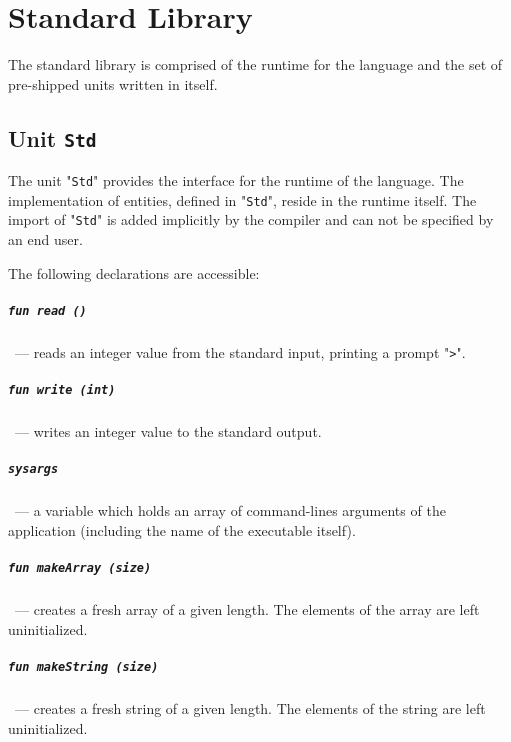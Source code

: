 \chapter{Standard Library}
\label{sec:stdlib}

The standard library is comprised of the runtime for the language and the set of pre-shipped units written in \lama itself.

\section{Unit \texttt{Std}}

The unit "\texttt{Std}" provides the interface for the runtime of the language. The implementation of
entities, defined in "\texttt{Std}", reside in the runtime itself. The import of "\texttt{Std}"
is added implicitly by the compiler and can not be specified by an end user.

The following declarations are accessible:

\paragraph{\lstinline|fun read ()|}~--- reads an integer value from the standard input, printing a prompt "\texttt{>}".

\paragraph{\lstinline|fun write (int)|}~--- writes an integer value to the standard output.

\paragraph{\lstinline|sysargs|}~--- a variable which holds an array of command-lines arguments of the application (including the
name of the executable itself).

\paragraph{\lstinline|fun makeArray (size)|}~--- creates a fresh array of a given length. The elements of the array are left uninitialized.

\paragraph{\lstinline|fun makeString (size)|}~--- creates a fresh string of a given length. The elements of the string are left uninitialized.

